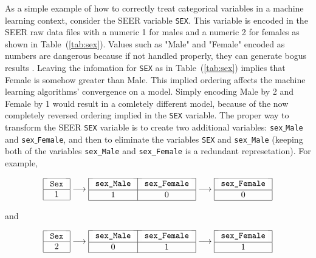 \documentclass[10pt,letterpaper]{article}
\newcommand{\codewhite}[1]{\colorbox{white}{\texttt{#1}}}
\begin{document}
As a simple example of how to correctly treat categorical variables in a machine learning context, consider the SEER variable \codewhite{SEX}. This variable is encoded in the SEER raw data files with a numeric 1 for males and a numeric 2 for females as shown in Table~(\ref{tab:sex}). Values such as "Male" and "Female" encoded as numbers are dangerous because if not handled properly, they can generate bogus results \cite{downey}. Leaving the infomation for \codewhite{SEX} as in Table~(\ref{tab:sex}) implies that Female is somehow greater than Male. This implied ordering affects the machine learning algorithms' convergence on a model. Simply encoding Male by 2 and Female by 1 would result in a comletely different model, because of the now completely reversed ordering implied in the \codewhite{SEX} variable. The proper way to transform the SEER \codewhite{SEX} variable is to create two additional variables: \codewhite{sex$\_$Male} and \codewhite{sex$\_$Female}, and then to eliminate the variables \codewhite{SEX} and \codewhite{sex\_Male} (keeping both of the variables \codewhite{sex\_Male} and \codewhite{sex\_Female} is a redundant represetation). For example,




\begin{equation}
\begin{array}{|c|} \hline
\mbox{\codewhite{Sex}} \\ \hline
1 \\ \hline \end{array} 
\longrightarrow
 \begin{array}{|c|c|}  \hline
\mbox{\codewhite{sex\_Male}} & \mbox{\codewhite{sex\_Female}} \\ \hline
1 & 0 \\ \hline
\end{array} 
\longrightarrow
\begin{array}{|c|}  \hline
\mbox{\codewhite{sex\_Female}} \\ \hline
0  \\ \hline \end{array}
\label{eqn:onehotmale}
\end{equation}

and 


\begin{equation}
\begin{array}{|c|} \hline
\mbox{\codewhite{Sex}} \\ \hline
2 \\ \hline \end{array} 
\longrightarrow
 \begin{array}{|c|c|}  \hline
\mbox{\codewhite{sex\_Male}} & \mbox{\codewhite{sex\_Female}} \\ \hline
0 & 1 \\ \hline
\end{array} 
\longrightarrow
\begin{array}{|c|}  \hline
\mbox{\codewhite{sex\_Female}} \\ \hline
1  \\ \hline \end{array}
\label{eqn:onehotfemale}
\end{equation}
\end{document}
